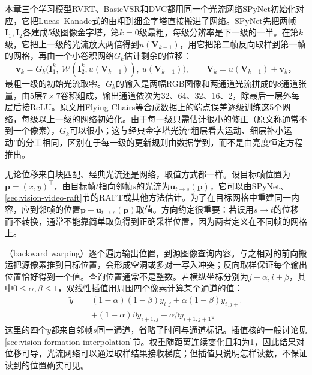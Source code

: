 本章三个学习模型RVRT、BasicVSR和DVC都用同一个光流网络SPyNet初始化对应，它把Lucas--Kanade式的由粗到细金字塔直接搬进了网络。SPyNet先把两帧$\bm{I}_1,\bm{I}_2$各建成5级图像金字塔，第$k=0$级最粗，每级分辨率是下一级的一半。在第$k$级，它把上一级的光流放大两倍得到$u(\bm{V}_{k-1})$，用它把第二帧反向取样到第一帧的网格，再由一个小卷积网络$G_k$估计剩余的位移：
\begin{equation}
  \bm{v}_k=G_k\bigl(\bm{I}^{k}_1,\ \mathcal{W}(\bm{I}^{k}_2,u(\bm{V}_{k-1})),\ u(\bm{V}_{k-1})\bigr),\qquad
  \bm{V}_k=u(\bm{V}_{k-1})+\bm{v}_k\text{，}
  \label{eq:vision-video-spynet}
\end{equation}
最粗一级的初始光流取零。$G_k$的输入是两幅RGB图像和两通道光流拼成的8通道张量，由5层$7\times7$卷积组成，输出通道依次为32、64、32、16、2，除最后一层外每层后接ReLU。原文用Flying Chairs等合成数据上的端点误差逐级训练这5个网络，每级以上一级的网络初始化。由于每一级只需估计很小的修正（原文称通常不到一个像素），$G_k$可以很小；这与经典金字塔光流“粗层看大运动、细层补小运动”的分工相同，区别在于每一级的更新规则由数据学到，而不是由亮度恒定方程推出。

无论位移来自块匹配、经典光流还是网络，取值方式都一样。设目标帧位置为$\bm{p}=(x,y)^\top$，由目标帧$t$指向邻帧$s$的光流为$\bm{u}_{t\to s}(\bm{p})$，它可以由SPyNet、\ref{sec:vision-video-raft}节的RAFT或其他方法估计。为了在目标网格中重建同一内容，应到邻帧的位置$\bm{p}+\bm{u}_{t\to s}(\bm{p})$取值。方向约定很重要：若误用$s\to t$的位移而不转换，通常不能靠简单取负得到正确采样位置，因为两者定义在不同帧的网格上。

（backward warping）逐个遍历输出位置，到源图像查询内容。与之相对的前向搬运把源像素推到目标位置，会形成空洞或多对一写入冲突；反向取样保证每个输出位置恰好得到一个值。查询位置通常不是整数。若横纵坐标分别为$j+\alpha,i+\beta$，其中$0\leq\alpha,\beta\leq1$，双线性插值用周围四个像素计算某个通道的值：
\begin{equation}
  \begin{aligned}
    \widetilde y={}&(1-\alpha)(1-\beta)y_{i,j}
       +\alpha(1-\beta)y_{i,j+1}\\
       &+(1-\alpha)\beta y_{i+1,j}
       +\alpha\beta y_{i+1,j+1}\text{。}
  \end{aligned}
  \label{eq:vision-video-bilinear}
\end{equation}
这里的四个$y$都来自邻帧$s$同一通道，省略了时间与通道标记。插值核的一般讨论见\ref{sec:vision-formation-interpolation}节。权重随距离连续变化且和为1，因此结果对位移可导，光流网络可以通过取样结果接收梯度；但插值只说明怎样读数，不保证读到的位置确实可见。


